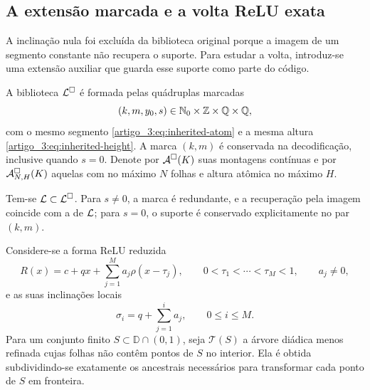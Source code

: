\subsection{A extensão marcada e a volta ReLU exata}

A inclinação nula foi
excluída da biblioteca original porque a imagem de um segmento constante não
recupera o suporte. Para estudar a volta, introduz-se uma extensão auxiliar
que guarda esse suporte como parte do código.

\begin{definition}\label{map:artigo_3:5.1}
\label{artigo_3:def:marked-completion}
A biblioteca $\mathcal{L}^\square$ é formada pelas quádruplas marcadas
\begin{equation}
 (k,m,y_0,s)\in\mathbb{N}_0\times\mathbb Z\times\mathbb Q\times\mathbb Q,
 \label{artigo_3:eq:marked-atoms}
\end{equation}
com o mesmo segmento \eqref{artigo_3:eq:inherited-atom} e a mesma altura
\eqref{artigo_3:eq:inherited-height}. A marca $(k,m)$ é conservada na decodificação,
inclusive quando $s=0$. Denote por $\mathcal{A}^\square(K)$ suas montagens
contínuas e por $\mathcal{A}^\square_{N,H}(K)$ aquelas com no máximo $N$
folhas e altura atômica no máximo $H$.
\end{definition}

Tem-se $\mathcal{L}\subset\mathcal{L}^\square$. Para $s\ne0$, a marca é redundante,
e a recuperação pela imagem coincide com a de $\mathcal{L}$; para $s=0$, o
suporte é conservado explicitamente no par $(k,m)$.

Considere-se a forma ReLU reduzida
\begin{equation}
 R(x)=c+qx+\sum_{j=1}^{M}a_j\rho(x-\tau_j),
 \qquad 0<\tau_1<\cdots<\tau_M<1,
 \qquad a_j\ne0,
 \label{artigo_3:eq:reduced-relu-reverse}
\end{equation}
e as suas inclinações locais
\begin{equation}
 \sigma_i=q+\sum_{j=1}^{i}a_j,
 \qquad 0\le i\le M.
 \label{artigo_3:eq:reverse-local-slopes}
\end{equation}
Para um conjunto finito $S\subset\mathbb D\cap(0,1)$, seja
$\mathcal T(S)$ a árvore diádica menos refinada cujas folhas não contêm
pontos de $S$ no interior. Ela é obtida subdividindo-se exatamente os ancestrais
necessários para transformar cada ponto de $S$ em fronteira.

